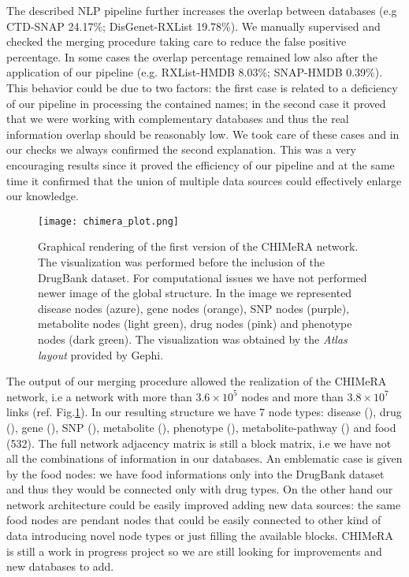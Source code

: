 \documentclass{standalone}
\begin{document}
The described NLP pipeline further increases the overlap between databases (e.g CTD-SNAP 24.17\%; DisGenet-RXList 19.78\%).
We manually supervised and checked the merging procedure taking care to reduce the false positive percentage.
In some cases the overlap percentage remained low also after the application of our pipeline (e.g. RXList-HMDB 8.03\%; SNAP-HMDB 0.39\%).
This behavior could be due to two factors: the first case is related to a deficiency of our pipeline in processing the contained names; in the second case it proved that we were working with complementary databases and thus the real information overlap should be reasonably low.
We took care of these cases and in our checks we always confirmed the second explanation.
This was a very encouraging results since it proved the efficiency of our pipeline and at the same time it confirmed that the union of multiple data sources could effectively enlarge our knowledge.

\begin{figure}[htbp]
\centering
\texttt{[image: chimera\_plot.png]}
\caption{Graphical rendering of the first version of the CHIMeRA network.
The visualization was performed before the inclusion of the DrugBank dataset.
For computational issues we have not performed newer image of the global structure.
In the image we represented disease nodes (azure), gene nodes (orange), SNP nodes (purple), metabolite nodes (light green), drug nodes (pink) and phenotype nodes (dark green).
The visualization was obtained by the \emph{Atlas layout} provided by \textsf{Gephi}.
}
\label{fig:chimera}
\end{figure}

The output of our merging procedure allowed the realization of the \textsf{CHIMeRA} network, i.e a network with more than $3.6\times10^5$ nodes and more than $3.8\times10^7$ links (ref. Fig.\ref{fig:chimera}).
In our resulting structure we have 7 node types: disease (), drug (), gene (), SNP (), metabolite (), phenotype (), metabolite-pathway () and food (532).
The full network adjacency matrix is still a block matrix, i.e we have not all the combinations of information in our databases.
An emblematic case is given by the food nodes: we have food informations only into the DrugBank dataset and thus they would be connected only with drug types.
On the other hand our network architecture could be easily improved adding new data sources: the same food nodes are pendant nodes that could be easily connected to other kind of data introducing novel node types or just filling the available blocks.
\textsf{CHIMeRA} is still a work in progress project so we are still looking for improvements and new databases to add.


\end{document}
